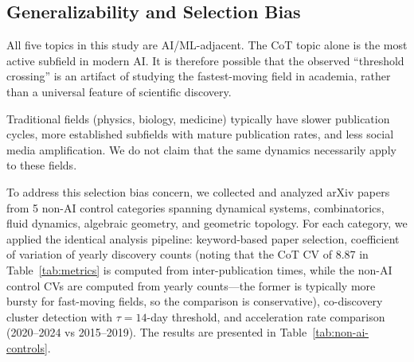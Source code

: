 \documentclass[12pt]{article}
\begin{document}
\subsection{Generalizability and Selection Bias}

All five topics in this study are AI/ML-adjacent. The CoT topic alone is the most active subfield in modern AI. It is therefore possible that the observed ``threshold crossing'' is an artifact of studying the fastest-moving field in academia, rather than a universal feature of scientific discovery.

Traditional fields (physics, biology, medicine) typically have slower publication cycles, more established subfields with mature publication rates, and less social media amplification. We do not claim that the same dynamics necessarily apply to these fields.

To address this selection bias concern, we collected and analyzed arXiv papers from 5 non-AI control categories spanning dynamical systems, combinatorics, fluid dynamics, algebraic geometry, and geometric topology. For each category, we applied the identical analysis pipeline: keyword-based paper selection, coefficient of variation of yearly discovery counts (noting that the CoT CV of 8.87 in Table~\ref{tab:metrics} is computed from inter-publication times, while the non-AI control CVs are computed from yearly counts---the former is typically more bursty for fast-moving fields, so the comparison is conservative), co-discovery cluster detection with $\tau=14$-day threshold, and acceleration rate comparison (2020--2024 vs 2015--2019). The results are presented in Table~\ref{tab:non-ai-controls}.
\end{document}
